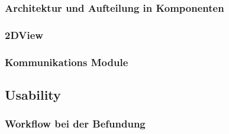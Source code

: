 \subsubsection{Architektur und Aufteilung in Komponenten}
\label{sec:Architektur und Aufteilung in Komponenten}

\subsubsection{2DView}
\label{sec:2DView}

\subsubsection{Kommunikations Module}
\label{sec:Kommunikations Module}

\subsection{Usability}
\label{sec:Usability}

\subsubsection{Workflow bei der Befundung}
\label{sec:Workflow bei der Befundung}

